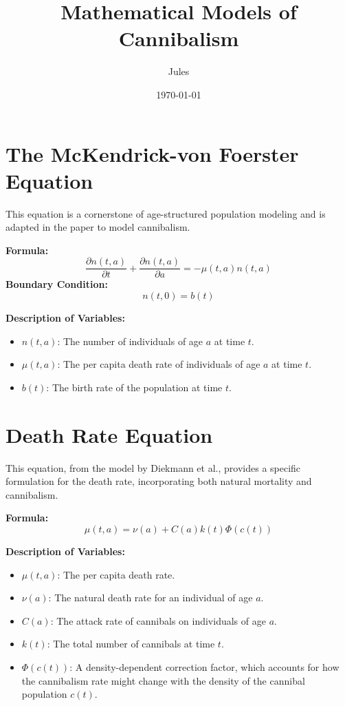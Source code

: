 \documentclass[12pt]{article}
\title{Mathematical Models of Cannibalism}
\author{Jules}
\date{\today}
\begin{document}
\maketitle

\section{The McKendrick-von Foerster Equation}

This equation is a cornerstone of age-structured population modeling and is adapted in the paper to model cannibalism.

\textbf{Formula:}
\begin{equation}
\frac{\partial n(t, a)}{\partial t} + \frac{\partial n(t, a)}{\partial a} = -\mu(t, a) n(t, a)
\end{equation}
\textbf{Boundary Condition:}
\begin{equation}
n(t, 0) = b(t)
\end{equation}

\textbf{Description of Variables:}
\begin{itemize}
    \item \(n(t, a)\): The number of individuals of age \(a\) at time \(t\).
    \item \(\mu(t, a)\): The per capita death rate of individuals of age \(a\) at time \(t\).
    \item \(b(t)\): The birth rate of the population at time \(t\).
\end{itemize}

\section{Death Rate Equation}

This equation, from the model by Diekmann et al., provides a specific formulation for the death rate, incorporating both natural mortality and cannibalism.

\textbf{Formula:}
\begin{equation}
\mu(t, a) = \nu(a) + C(a)k(t)\Phi(c(t))
\end{equation}

\textbf{Description of Variables:}
\begin{itemize}
    \item \(\mu(t, a)\): The per capita death rate.
    \item \(\nu(a)\): The natural death rate for an individual of age \(a\).
    \item \(C(a)\): The attack rate of cannibals on individuals of age \(a\).
    \item \(k(t)\): The total number of cannibals at time \(t\).
    \item \(\Phi(c(t))\): A density-dependent correction factor, which accounts for how the cannibalism rate might change with the density of the cannibal population \(c(t)\).
\end{itemize}
\end{document}
